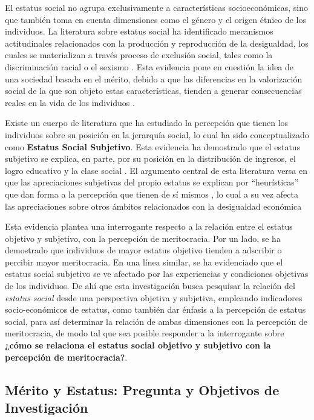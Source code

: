 \documentclass[12pt]{article}
\begin{document}
El estatus social no agrupa exclusivamente a características socioeconómicas, sino que también toma en cuenta dimensiones como el género y el origen étnico de los individuos. La literatura sobre estatus social ha identificado mecanismos actitudinales relacionados con la producción y reproducción de la desigualdad, los cuales se materializan a través proceso de exclusión social, tales como la discriminación racial o el sexismo \citep{Ridgeway2014,Laurison2016}. Esta evidencia pone en cuestión la idea de una sociedad basada en el mérito, debido a que las diferencias en la valorización social de la que son objeto estas características, tienden a generar consecuencias reales en la vida de los individuos \citep{Bobbitt-zeher2007}.

Existe un cuerpo de literatura que ha estudiado la percepción que tienen los individuos sobre su posición en la jerarquía social, lo cual ha sido conceptualizado como \textbf{Estatus Social Subjetivo}. Esta evidencia ha demostrado que el estatus subjetivo se explica, en parte, por su posición en la distribución de ingresos, el logro educativo \citep{Evans2004,Lindemann2014} y la clase social \citep{Castillo2013}. El argumento central de esta literatura versa en que las apreciaciones subjetivas del propio estatus se explican por ``heurísticas'' que dan forma a la percepción que tienen de sí mismos \citep{Evans1992,Evans2017}, lo cual a su vez afecta las apreciaciones sobre otros ámbitos relacionados con la desigualdad económica \citep{Castillo2012}

Esta evidencia plantea una interrogante respecto a la relación entre el estatus objetivo y subjetivo, con la percepción de meritocracia. Por un lado, se ha demostrado que individuos de mayor estatus objetivo tienden a adscribir o percibir mayor meritocracia. En una línea similar, se ha evidenciado que el estatus social subjetivo se ve afectado por las experiencias y condiciones objetivas de los individuos. De ahí que esta investigación busca pesquisar la relación del \textit{estatus social} desde una perspectiva objetiva y subjetiva, empleando indicadores socio-económicos de estatus, como también dar énfasis a la percepción de estatus social, para así determinar la relación de ambas dimensiones con la percepción de meritocracia, de modo tal que sea posible responder a la interrogante sobre \textbf{¿cómo se relaciona el estatus social objetivo y subjetivo con la percepción de meritocracia?}. 

\subsection{Mérito y Estatus: Pregunta y Objetivos de Investigación}
	
\end{document}
